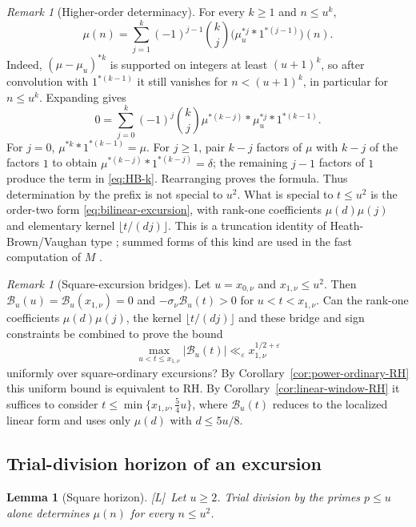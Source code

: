 \documentclass[11pt]{amsart}
\numberwithin{equation}{section}
\theoremstyle{plain}
\newtheorem{lemma}[theorem]{Lemma}
\theoremstyle{definition}
\theoremstyle{remark}
\newtheorem{remark}[theorem]{Remark}
\newcommand{\eps}{\varepsilon}
\newcommand{\tagL}{\textup{[L]}}
\begin{document}
\begin{remark}[Higher-order determinacy]
\label{rem:prefix-k}
For every $k\ge1$ and $n\le u^k$,
\begin{equation}
\label{eq:HB-k}
\mu(n)=\sum_{j=1}^{k}(-1)^{j-1}\binom{k}{j}
\bigl(\mu_u^{*j}*1^{*(j-1)}\bigr)(n).
\end{equation}
Indeed, $(\mu-\mu_u)^{*k}$ is supported on integers at least
$(u+1)^k$, so after convolution with $1^{*(k-1)}$ it still vanishes for
$n<(u+1)^k$, in particular for $n\le u^k$.  Expanding gives
\[
0=\sum_{j=0}^{k}(-1)^j\binom{k}{j}
\mu^{*(k-j)}*\mu_u^{*j}*1^{*(k-1)}.
\]
For $j=0$, $\mu^{*k}*1^{*(k-1)}=\mu$.  For $j\ge1$, pair
$k-j$ factors of $\mu$ with $k-j$ of the factors $1$ to obtain
$\mu^{*(k-j)}*1^{*(k-j)}=\delta$; the remaining $j-1$ factors of $1$
produce the term in \eqref{eq:HB-k}.  Rearranging proves the formula.
Thus determination by the prefix
is not special to $u^2$. What is special to $t\le u^2$ is the order-two form
\eqref{eq:bilinear-excursion}, with rank-one coefficients $\mu(d)\mu(j)$ and
elementary kernel $\lfloor t/(dj)\rfloor$. This is a truncation identity of
Heath-Brown/Vaughan type \cite{HB82}; summed forms of this kind are used in
the fast computation of $M$ \cite{HT23}.
\end{remark}

\begin{remark}[Square-excursion bridges]
\label{q:excursion-constraint}
Let $u=x_{0,\nu}$ and $x_{1,\nu}\le u^2$. Then
$\mathcal B_u(u)=\mathcal B_u(x_{1,\nu})=0$ and
$-\sigma_\nu\mathcal B_u(t)>0$ for $u<t<x_{1,\nu}$. Can the rank-one
coefficients $\mu(d)\mu(j)$, the kernel $\lfloor t/(dj)\rfloor$ and these
bridge and sign constraints be combined to prove the bound
\[
\max_{u<t\le x_{1,\nu}}|\mathcal B_u(t)|
\ll_\eps x_{1,\nu}^{1/2+\eps}
\]
uniformly over square-ordinary excursions? By
Corollary~\ref{cor:power-ordinary-RH} this uniform bound is equivalent to
RH. By Corollary~\ref{cor:linear-window-RH} it suffices to consider
$t\le\min\{x_{1,\nu},\frac54u\}$, where $\mathcal B_u(t)$ reduces to
the localized linear form and uses only $\mu(d)$ with $d\le5u/8$.
\end{remark}


\subsection{Trial-division horizon of an excursion}
\label{sec:prime_horizon}

\begin{lemma}[Square horizon]
\label{lem:square-horizon}
\tagL\ Let $u\ge2$. Trial division by the primes $p\le u$ alone determines $\mu(n)$
for every $n\le u^2$.
\end{lemma}
\end{document}
